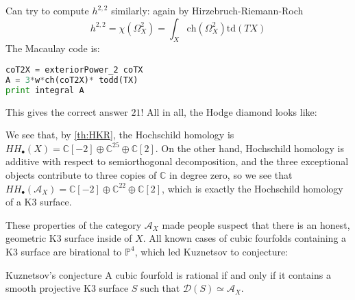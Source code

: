Can try to compute $h^{2,2}$ similarly: again by Hirzebruch-Riemann-Roch
$$h^{2,2}=\chi(\Omega_{X}^2)=\int_{X} \mathrm{ch}(\Omega^2_{X})\mathrm{td}(TX)  $$
The Macaulay code is: 

\begin{lstlisting}[language=Python] 
coT2X = exteriorPower_2 coTX
A = 3*w*ch(coT2X)* todd(TX)
print integral A
\end{lstlisting}
This gives the correct answer $21$! All in all, the Hodge diamond looks like: 

\begin{center}
\end{center}

We see that, by \ref{th:HKR}, the Hochschild homology is $HH_\bullet(X)=\mathbb{C}[-2]\oplus \mathbb{C}^{25}\oplus \mathbb{C}[2]$. On the other hand, Hochschild homology is additive with respect to semiorthogonal decomposition, and the three exceptional objects contribute to three copies of $\mathbb{C}$ in degree zero, so we see that $HH_\bullet(\mathcal{A}_X)=\mathbb{C}[-2]\oplus \mathbb{C}^{22}\oplus \mathbb{C}[2]$, which is exactly the Hochschild homology of a K3 surface.

These properties of the category $\mathcal{A}_X$ made people suspect that there is an honest, geometric K3 surface inside of $X$. All known cases of cubic fourfolds containing a K3 surface are birational to $\mathbb{P}^4$, which led Kuznetsov to conjecture:

\begin{conjecture}{}{Kuznetsov's conjecture}
A cubic fourfold is rational if and only if it contains a smooth projective K3 surface $S$ such that $\mathcal{D}(S)\simeq \mathcal{A}_X$.
\end{conjecture}

